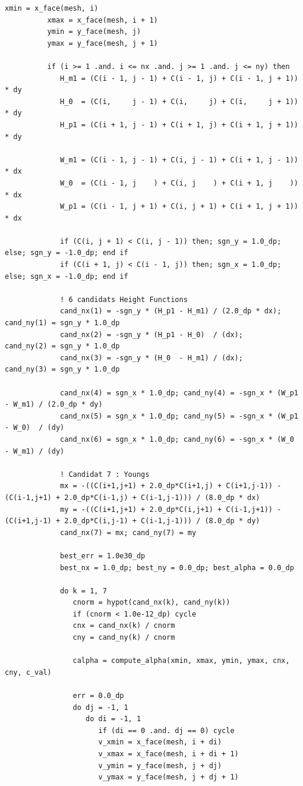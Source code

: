 \documentclass[10pt,a4paper,oneside]{book}
\begin{document}
\begin{lstlisting}[language={[95]Fortran}]
          xmin = x_face(mesh, i)
          xmax = x_face(mesh, i + 1)
          ymin = y_face(mesh, j)
          ymax = y_face(mesh, j + 1)

          if (i >= 1 .and. i <= nx .and. j >= 1 .and. j <= ny) then
             H_m1 = (C(i - 1, j - 1) + C(i - 1, j) + C(i - 1, j + 1)) * dy
             H_0  = (C(i,     j - 1) + C(i,     j) + C(i,     j + 1)) * dy
             H_p1 = (C(i + 1, j - 1) + C(i + 1, j) + C(i + 1, j + 1)) * dy

             W_m1 = (C(i - 1, j - 1) + C(i, j - 1) + C(i + 1, j - 1)) * dx
             W_0  = (C(i - 1, j    ) + C(i, j    ) + C(i + 1, j    )) * dx
             W_p1 = (C(i - 1, j + 1) + C(i, j + 1) + C(i + 1, j + 1)) * dx

             if (C(i, j + 1) < C(i, j - 1)) then; sgn_y = 1.0_dp; else; sgn_y = -1.0_dp; end if
             if (C(i + 1, j) < C(i - 1, j)) then; sgn_x = 1.0_dp; else; sgn_x = -1.0_dp; end if

             ! 6 candidats Height Functions
             cand_nx(1) = -sgn_y * (H_p1 - H_m1) / (2.0_dp * dx); cand_ny(1) = sgn_y * 1.0_dp
             cand_nx(2) = -sgn_y * (H_p1 - H_0)  / (dx);          cand_ny(2) = sgn_y * 1.0_dp
             cand_nx(3) = -sgn_y * (H_0  - H_m1) / (dx);          cand_ny(3) = sgn_y * 1.0_dp

             cand_nx(4) = sgn_x * 1.0_dp; cand_ny(4) = -sgn_x * (W_p1 - W_m1) / (2.0_dp * dy)
             cand_nx(5) = sgn_x * 1.0_dp; cand_ny(5) = -sgn_x * (W_p1 - W_0)  / (dy)
             cand_nx(6) = sgn_x * 1.0_dp; cand_ny(6) = -sgn_x * (W_0  - W_m1) / (dy)

             ! Candidat 7 : Youngs
             mx = -((C(i+1,j+1) + 2.0_dp*C(i+1,j) + C(i+1,j-1)) - (C(i-1,j+1) + 2.0_dp*C(i-1,j) + C(i-1,j-1))) / (8.0_dp * dx)
             my = -((C(i+1,j+1) + 2.0_dp*C(i,j+1) + C(i-1,j+1)) - (C(i+1,j-1) + 2.0_dp*C(i,j-1) + C(i-1,j-1))) / (8.0_dp * dy)
             cand_nx(7) = mx; cand_ny(7) = my

             best_err = 1.0e30_dp
             best_nx = 1.0_dp; best_ny = 0.0_dp; best_alpha = 0.0_dp

             do k = 1, 7
                cnorm = hypot(cand_nx(k), cand_ny(k))
                if (cnorm < 1.0e-12_dp) cycle
                cnx = cand_nx(k) / cnorm
                cny = cand_ny(k) / cnorm

                calpha = compute_alpha(xmin, xmax, ymin, ymax, cnx, cny, c_val)

                err = 0.0_dp
                do dj = -1, 1
                   do di = -1, 1
                      if (di == 0 .and. dj == 0) cycle
                      v_xmin = x_face(mesh, i + di)
                      v_xmax = x_face(mesh, i + di + 1)
                      v_ymin = y_face(mesh, j + dj)
                      v_ymax = y_face(mesh, j + dj + 1)


\end{lstlisting}
\end{document}
